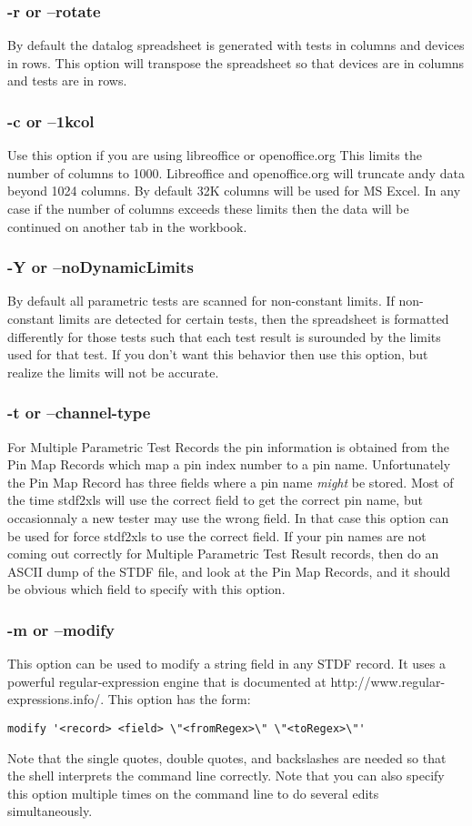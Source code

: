 \documentclass[letterpaper]{article}
\begin{document}
\subsubsection{-r or --rotate}
By default the datalog spreadsheet is generated with tests in columns and devices in rows.  This
option will transpose the spreadsheet so that devices are in columns and tests are in rows.

\subsubsection{-c or --1kcol}
Use this option if you are using libreoffice or openoffice.org  This limits the number
of columns to 1000.  Libreoffice and openoffice.org will truncate andy data beyond 1024 columns.
By default 32K columns will be used for MS Excel.  In any case if the number of columns
exceeds these limits then the data will be continued on another tab in the workbook.

\subsubsection{-Y or --noDynamicLimits}
By default all parametric tests are scanned for non-constant limits.  If non-constant
limits are detected for certain tests, then the spreadsheet is formatted differently
for those tests such that each test result is surounded by the limits used for that
test.  If you don't want this behavior then use this option, but realize the limits
will not be accurate.

\subsubsection{-t or --channel-type}
For Multiple Parametric Test Records the pin information is obtained from
the Pin Map Records which map a pin index number to a pin name.  Unfortunately
the Pin Map Record has three fields where a pin name {\it might} be stored.
Most of the time stdf2xls will use the correct field to get the correct
pin name, but occasionnaly a new tester may use the wrong field.  In that
case this option can be used for force stdf2xls to use the correct field.
If your pin names are not coming out correctly for Multiple Parametric Test Result
records, then do an ASCII dump of the STDF file, and look at the Pin Map Records,
and it should be obvious which field to specify with this option.

\subsubsection{-m or --modify}
This option can be used to modify a string field in any STDF record. It uses a powerful
regular-expression engine that is documented at http://www.regular-expressions.info/.
This option has the form:
\begin{verbatim}
modify '<record> <field> \"<fromRegex>\" \"<toRegex>\"'
\end{verbatim}
Note that the single quotes, double quotes, and backslashes are needed so that the shell
interprets the command line correctly.  Note that you can also specify this
option multiple times on the command line to do several edits simultaneously.
\end{document}
